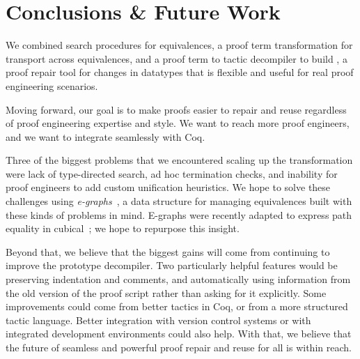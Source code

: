 \section{Conclusions \& Future Work}
\label{sec:discussion}

We combined search procedures for equivalences, a proof term transformation for transport across equivalences,
and a proof term to tactic decompiler to build \toolname,
a proof repair tool for changes in datatypes that is flexible and useful for real proof engineering scenarios.


Moving forward, our goal is to make proofs easier to repair and reuse regardless of proof engineering expertise and style.
We want to reach more proof engineers, and we want \toolname to integrate seamlessly with Coq.

Three of the biggest problems that we encountered scaling up the \toolname transformation were lack of type-directed search,
ad hoc termination checks, and inability for proof engineers to add custom unification heuristics.
We hope to solve these challenges using \textit{e-graphs}~\cite{egraph1},
a data structure %
for managing equivalences
built with these kinds of problems in mind.
E-graphs were recently adapted to express path equality in cubical~\cite{egraph6}; we hope to repurpose this insight.

Beyond that, we believe that the biggest gains will come from continuing to improve the prototype decompiler.
Two particularly helpful features would be preserving indentation and comments, and automatically using information from the old 
version of the proof script rather than asking for it explicitly.
Some improvements could come from better tactics in Coq,
or from a more structured tactic language.
Better integration with version control systems or with integrated development environments could also help.
With that, we believe that the future of seamless and powerful proof repair and reuse for all is within reach.


